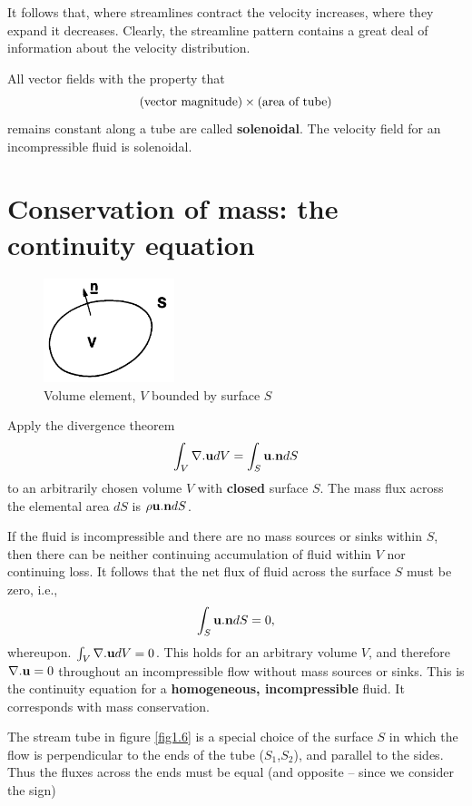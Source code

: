 \documentclass[10pt]{report}
\begin{document}
It follows that, where streamlines contract the velocity increases, where
they expand it decreases. Clearly, the streamline pattern contains a great
deal of information about the velocity distribution.

All vector fields with the property that
\[
\hbox{(vector magnitude)} \times \hbox{(area of tube)}
\]
remains constant along a tube are called \textbf{solenoidal}. The velocity
field for an incompressible fluid is solenoidal.

\section{Conservation of mass: the continuity equation}

\begin{figure}
\centerline{\includegraphics[width=1.5in]{Section7.pdf}}
\caption{ Volume element, $V$ bounded by surface $S$}
\label{fig1.7}
\end{figure}


Apply the divergence theorem
\[
\int_V {\nabla . {\bf u} } dV=\int_S {\bf u} . {\bf n}dS
\]
to an arbitrarily chosen volume $V$ with \textbf{closed} surface $S$.
The mass flux across the elemental area $dS$ is $\rho {\bf u}.
{\bf n}dS$.

If the fluid is incompressible and there are no mass sources or sinks within
$S$, then there can be neither continuing accumulation of fluid within $V$ nor
continuing loss. It follows that the net flux of fluid across the surface $S$
must be zero, i.e.,
\[
\int_S  {\bf u} . {\bf n}dS=0,
\]
whereupon. $\int_V {\nabla . {\bf u} } dV=0$. This holds for an
arbitrary volume $V$, and therefore $\nabla . {\bf u}=0$ throughout an
incompressible flow without mass sources or sinks. This is the continuity
equation for a \textbf{homogeneous, incompressible} fluid. It corresponds
with mass conservation.

The stream tube in figure \ref{fig1.6} is a special choice of the surface $S$
in which the flow is perpendicular to the ends of the tube ($S_{1}$,$S_{2}$), and parallel to the
sides. Thus the fluxes across the ends must be equal (and opposite -- since we consider
the sign)
\end{document}
